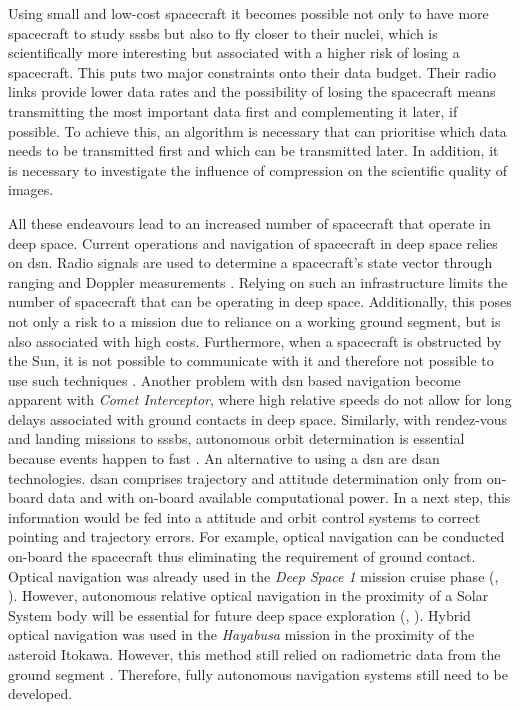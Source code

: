 Using small and low-cost spacecraft it becomes possible not only to have more spacecraft to study \gls{sssb}s but also to fly closer to their nuclei, which is scientifically more interesting but associated with a higher risk of losing a spacecraft. This puts two major constraints onto their data budget. Their radio links provide lower data rates and the possibility of losing the spacecraft means transmitting the most important data first and complementing it later, if possible. To achieve this, an algorithm is necessary that can prioritise which data needs to be transmitted first and which can be transmitted later. In addition, it is necessary to investigate the influence of compression on the scientific quality of images.

All these endeavours lead to an increased number of spacecraft that operate in deep space. Current operations and navigation of spacecraft in deep space relies on \gls{dsn}. Radio signals are used to determine a spacecraft's state vector through ranging and Doppler measurements \cite{ramamurthy2015delta}. Relying on such an infrastructure limits the number of spacecraft that can be operating in deep space. Additionally, this poses not only a risk to a mission due to reliance on a working ground segment, but is also associated with high costs. Furthermore, when a spacecraft is obstructed by the Sun, it is not possible to communicate with it and therefore not possible to use such techniques \cite{kominato2006optical}. Another problem with \gls{dsn} based navigation become apparent with \textit{Comet Interceptor}, where high relative speeds do not allow for long delays associated with ground contacts in deep space. Similarly, with rendez-vous and landing missions to \gls{sssb}s, autonomous orbit determination is essential because events happen to fast \cite{shuang2013imageprocessing}. An alternative to using a \gls{dsn} are \gls{dsan} technologies. \gls{dsan} comprises trajectory and attitude determination only from on-board data and with on-board available computational power. In a next step, this information would be fed into a attitude and orbit control systems to correct pointing and trajectory errors. For example, optical navigation can be conducted on-board the spacecraft thus eliminating the requirement of ground contact. Optical navigation was already used in the \textit{Deep Space 1} mission cruise phase (\cite{Riedel2000AutonomousReport}, \cite{bhaskaran2012autonomous}). However, autonomous relative optical navigation in the proximity of a Solar System body will be essential for future deep space exploration (\cite{steffes2017deep}, \cite{martin2006jpl}). Hybrid optical navigation was used in the \textit{Hayabusa} mission in the proximity of the asteroid Itokawa. However, this method still relied on radiometric data from the ground segment \cite{kominato2006optical}. Therefore, fully autonomous navigation systems still need to be developed.

